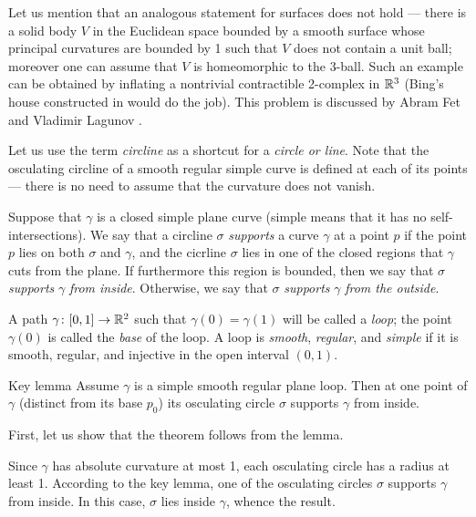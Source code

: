 \documentclass{article}
\begin{document}
Let us mention that an analogous statement for surfaces does not hold --- there is a solid body $V$ in the Euclidean space bounded by a smooth surface whose principal curvatures are bounded by 1 such that $V$ does not contain a unit ball; moreover one can assume that $V$ is homeomorphic to the 3-ball.
Such an example can be obtained by inflating a nontrivial contractible 2-complex in $\mathbb{R}^3$ 
(Bing's house constructed in \cite{bing} would do the job).
This problem is discussed by Abram Fet and Vladimir Lagunov \cite{lagunov-2,lagunov-fet}%
.

\medskip


Let us use the term \emph{circline} as a shortcut for a \emph{circle or line}.
Note that the osculating circline of a smooth regular simple curve is defined at each of its points --- there is no need to assume that the curvature does not vanish.

Suppose that $\gamma$ is a closed simple plane curve (simple means that it has no self-intersections).
We say that a circline $\sigma$ \emph{supports} a curve $\gamma$ at a point $p$ if the point $p$ lies on both $\sigma$ and $\gamma$, and the cicrline $\sigma$ lies in one of the closed regions that $\gamma$ cuts from the plane.
If furthermore this region is bounded, then  we say that $\sigma$ \emph{supports} $\gamma$ \emph{from inside}.
Otherwise, we say that $\sigma$ \emph{supports} $\gamma$ \emph{from the outside}.

A path $\gamma\: [0,1]\z\to \mathbb{R}^2$ such that $\gamma (0) = \gamma (1)$ will be called a \emph{loop};
the point $\gamma (0)$ is called the \emph{base} of the loop.
A loop is \emph{smooth}, \emph{regular}, and \emph{simple} if it is smooth, regular, and injective in the open interval $(0,1)$.

\begin{thm}{Key lemma}\label{thm:moon}
Assume $\gamma$ is a simple smooth regular plane loop.
Then at one point of $\gamma$ (distinct from its base $p_0$) its osculating circle $\sigma$ supports $\gamma$ from inside.
\end{thm}

First, let us show that the theorem follows from the lemma.

Since $\gamma$ has absolute curvature at most 1, each osculating circle has a radius at least 1.
According to the key lemma, one of the osculating circles $\sigma$ supports $\gamma$ from inside.
In this case, $\sigma$ lies inside $\gamma$, whence the result.
\qeds
\end{document}
